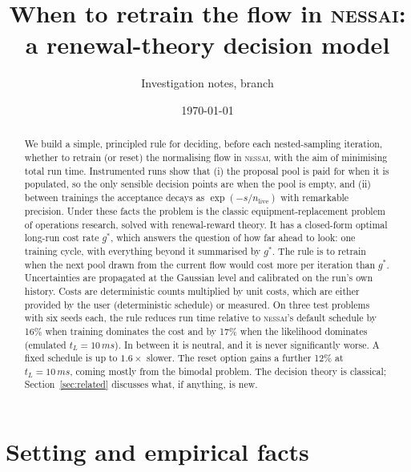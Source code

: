 \documentclass[11pt,a4paper]{article}
\title{When to retrain the flow in \textsc{nessai}:\\ a renewal-theory decision model}
\author{Investigation notes, branch \code{claude/nessai-retrain-decision-pmm9kr}}
\date{\today}
\newcommand{\nlive}{n_{\mathrm{live}}}
\begin{document}
\maketitle

\begin{abstract}
We build a simple, principled rule for deciding, before each nested-sampling
iteration, whether to retrain (or reset) the normalising flow in
\textsc{nessai}, with the aim of minimising total run time. Instrumented runs
show that (i) the proposal pool is paid for when it is populated, so the only
sensible decision points are when the pool is empty, and (ii) between
trainings the acceptance decays as $\exp(-s/\nlive)$ with remarkable
precision. Under these facts the problem is the classic equipment-replacement
problem of operations research, solved with renewal-reward theory. It has a closed-form optimal long-run cost rate
$g^*$, which answers the question of how far ahead to look: one training
cycle, with everything beyond it summarised by $g^*$. The rule is to retrain
when the next pool drawn from the current flow would cost more per iteration
than $g^*$. Uncertainties are propagated at the Gaussian level and calibrated
on the run's own history. Costs are deterministic counts multiplied by unit
costs, which are either provided by the user (deterministic schedule) or
measured. On three test problems with six seeds each, the rule reduces run time
relative to \textsc{nessai}'s default schedule by 16\% when training dominates
the cost and by 17\% when the likelihood dominates (emulated
$t_L=10\,ms$). In between it is neutral, and it is never significantly
worse. A fixed schedule is up to $1.6\times$ slower. The reset option gains a
further 12\% at $t_L=10\,ms$, coming mostly from the bimodal problem.
The decision theory is classical; Section~\ref{sec:related} discusses what,
if anything, is new.
\end{abstract}

\section{Setting and empirical facts}\label{sec:facts}
\end{document}
